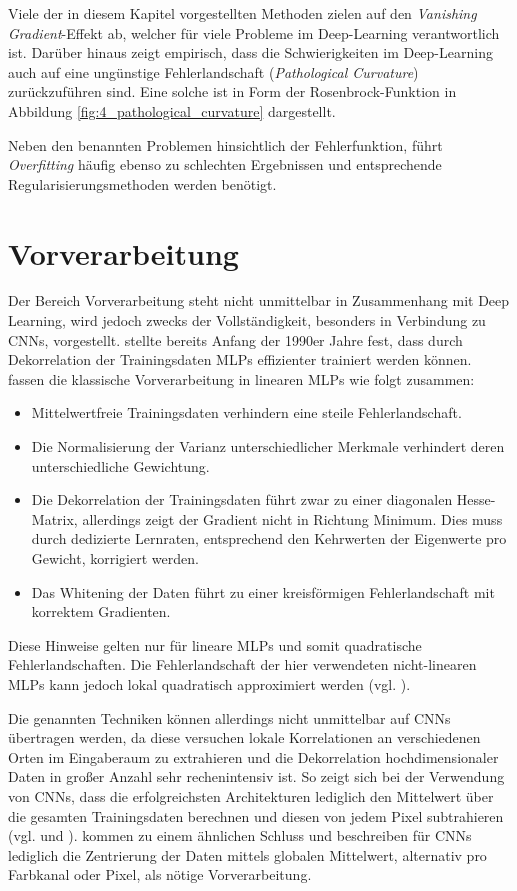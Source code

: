 Viele der in diesem Kapitel vorgestellten Methoden zielen auf den  \textit{Vanishing Gradient}-Effekt ab, welcher für viele Probleme im Deep-Learning verantwortlich ist. Darüber hinaus zeigt \cite{Martens2010} empirisch, dass die Schwierigkeiten im Deep-Learning auch auf eine ungünstige Fehlerlandschaft (\textit{Pathological Curvature}) zurückzuführen sind. Eine solche ist in Form der Rosenbrock-Funktion in Abbildung \ref{fig:4_pathological_curvature} dargestellt. 

Neben den benannten Problemen hinsichtlich der Fehlerfunktion, führt \textit{Overfitting} häufig ebenso zu schlechten Ergebnissen und entsprechende Regularisierungsmethoden werden benötigt.

\section{Vorverarbeitung}
Der Bereich Vorverarbeitung steht nicht unmittelbar in Zusammenhang mit Deep Learning, wird jedoch zwecks der Vollständigkeit, besonders in Verbindung zu CNNs, vorgestellt.
\cite{Becker1991} stellte bereits Anfang der 1990er Jahre fest, dass durch Dekorrelation der Trainingsdaten MLPs effizienter trainiert werden können. 
\cite{LeCun1998b} fassen die klassische Vorverarbeitung in linearen MLPs wie folgt zusammen:
\begin{itemize}
\item Mittelwertfreie Trainingsdaten verhindern eine steile Fehlerlandschaft. 
\item Die Normalisierung der Varianz unterschiedlicher Merkmale verhindert deren unterschiedliche Gewichtung.
\item Die Dekorrelation der Trainingsdaten führt zwar zu einer diagonalen Hesse-Matrix, allerdings zeigt der Gradient nicht in Richtung Minimum. Dies muss durch dedizierte Lernraten, entsprechend den Kehrwerten der Eigenwerte pro Gewicht, korrigiert werden.
\item Das Whitening der Daten führt zu einer kreisförmigen Fehlerlandschaft mit korrektem Gradienten.
\end{itemize}
Diese Hinweise gelten nur für lineare MLPs und somit quadratische Fehlerlandschaften. Die Fehlerlandschaft der hier verwendeten nicht-linearen MLPs kann jedoch lokal quadratisch approximiert werden (vgl. \cite{Hinton2015}).

Die genannten Techniken können allerdings nicht unmittelbar auf CNNs übertragen werden, da diese versuchen lokale Korrelationen an verschiedenen Orten im Eingaberaum zu extrahieren und die Dekorrelation hochdimensionaler Daten in großer Anzahl sehr rechenintensiv ist.
So zeigt sich bei der Verwendung von CNNs, dass die erfolgreichsten Architekturen lediglich den Mittelwert über die gesamten Trainingsdaten berechnen und diesen von jedem Pixel subtrahieren (vgl. \cite{Krizhevsky2012} und \cite{Simonyan2014}).
\cite{Kaparthy2014} kommen zu einem ähnlichen Schluss und beschreiben für CNNs lediglich die Zentrierung der Daten mittels globalen Mittelwert, alternativ pro Farbkanal oder Pixel, als nötige Vorverarbeitung. 

